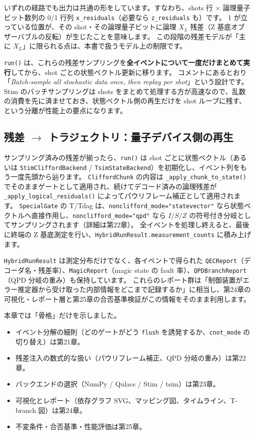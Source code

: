 いずれの経路でも出力は共通の形をしています。すなわち、shots 行 $\times$ 論理量子ビット数列の 0/1 行列 \lstinline{x_residuals}（必要なら \lstinline{z_residuals} も）です。
1 が立っている位置が、その shot・その論理量子ビットに論理 $X_L$ 残差（Z 基底オブザーバブルの反転）が生じたことを意味します。
この段階の残差モデルが「主に $X_L$」に限られる点は、本書で扱うモデル上の制限です。

\lstinline{run()} は、これらの残差サンプリングを\textbf{全イベントについて一度だけまとめて実行}してから、shot ごとの状態ベクトル更新に移ります。
コメントにあるとおり「\textit{Batch-sample all stochastic data once, then replay per shot}」という設計です。
Stim のバッチサンプリングは shots をまとめて処理する方が高速なので、乱数の消費を先に済ませておき、状態ベクトル側の再生だけを shot ループに残す、という分離が性能上の要点になります。

\subsection{残差 $\to$ トラジェクトリ：量子デバイス側の再生}

サンプリング済みの残差が揃ったら、\lstinline{run()} は shot ごとに状態ベクトル（あるいは \lstinline{StimCliffordBackend} / \lstinline{TsimStateBackend}）を初期化し、イベント列をもう一度先頭から辿ります。
\lstinline{CliffordChunk} の内容は \lstinline{_apply_chunk_to_state()} でそのままゲートとして適用され、続けてデコード済みの論理残差が \lstinline{_apply_logical_residuals()} によってパウリフレーム補正として適用されます。
\lstinline{SpecialGate} の T/Tdag は、\lstinline{nonclifford_mode="statevector"} なら状態ベクトルへ直接作用し、\lstinline{nonclifford_mode="qpd"} なら $I/S/Z$ の符号付き分岐としてサンプリングされます（詳細は第22章）。
全イベントを処理し終えると、最後に終端の Z 基底測定を行い、\lstinline{HybridRunResult.measurement_counts} に積み上げます。

\lstinline{HybridRunResult} は測定分布だけでなく、各イベントで得られた \lstinline{QECReport}（デコーダ名・残差率）、\lstinline{MagicReport}（magic state の fault 率）、\lstinline{QPDBranchReport}（QPD 分岐の重み）も保持しています。
これらのレポート群は「制御装置がエラー推定器から受け取った内部情報をどこまで記録するか」に相当し、第24章の可視化・レポート層と第25章の合否基準検証がこの情報をそのまま利用します。

\begin{notebox}
  本章では「骨格」だけを示しました。
  \begin{itemize}
    \item イベント分解の細則（どのゲートがどう \lstinline{flush} を誘発するか、\lstinline{cnot_mode} の切り替え）は第21章。
    \item 残差注入の数式的な扱い（パウリフレーム補正、QPD 分岐の重み）は第22章。
    \item バックエンドの選択（NumPy / Qulacs / Stim / tsim）は第23章。
    \item 可視化とレポート（依存グラフ SVG、マッピング図、タイムライン、T-branch 図）は第24章。
    \item 不変条件・合否基準・性能評価は第25章。
  \end{itemize}
\end{notebox}

